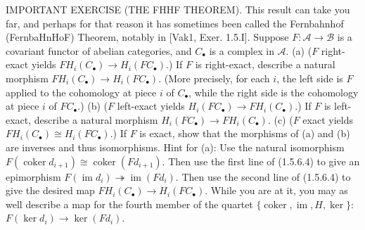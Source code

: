 IMPORTANT EXERCISE (THE FHHF THEOREM). This result can take you far, and perhaps for that reason it has sometimes been called the Fernbahnhof (FernbaHnHoF) Theorem, notably in [Vak1, Exer. 1.5.I]. Suppose $F : \mathcal{A} \to \mathcal{B}$ is a covariant functor of abelian categories, and $C_\bullet$ is a complex in $\mathcal{A}$. (a) ($F$ right-exact yields $F H_i(C_\bullet) \to H_i(F C_\bullet)$.) If $F$ is right-exact, describe a natural morphism $F H_i(C_\bullet) \to H_i(F C_\bullet)$. (More precisely, for each $i$, the left side is $F$ applied to the cohomology at piece $i$ of $C_\bullet$, while the right side is the cohomology at piece $i$ of $F C_\bullet$.) (b) ($F$ left-exact yields $H_i(F C_\bullet) \to F H_i(C_\bullet)$.) If $F$ is left-exact, describe a natural morphism $H_i(F C_\bullet) \to F H_i(C_\bullet)$. (c) ($F$ exact yields $F H_i(C_\bullet) \cong H_i(F C_\bullet)$.) If $F$ is exact, show that the morphisms of (a) and (b) are inverses and thus isomorphisms. Hint for (a): Use the natural isomorphism $F(\operatorname{coker} d_{i+1}) \cong \operatorname{coker}(F d_{i+1})$. Then use the first line of (1.5.6.4) to give an epimorphism $F(\operatorname{im} d_i) \twoheadrightarrow \operatorname{im}(F d_i)$. Then use the second line of (1.5.6.4) to give the desired map $F H_i(C_\bullet) \to H_i(F C_\bullet)$. While you are at it, you may as well describe a map for the fourth member of the quartet $\{\operatorname{coker},\operatorname{im},H,\ker\}$: $F(\ker d_i) \to \ker(F d_i)$.
